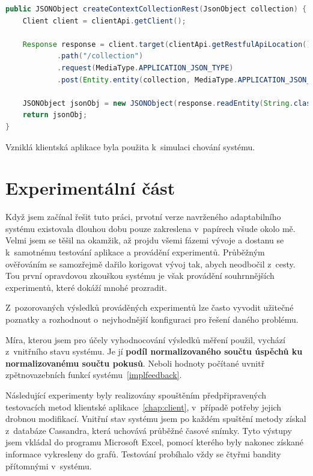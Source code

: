 \documentclass[thesis=M,czech]{FITthesis}[2014/05/07]
\begin{document}
\begin{lstlisting}[language=java]
public JSONObject createContextCollectionRest(JsonObject collection) {
    Client client = clientApi.getClient();

    Response response = client.target(clientApi.getRestfulApiLocation())
            .path("/collection")
            .request(MediaType.APPLICATION_JSON_TYPE)
            .post(Entity.entity(collection, MediaType.APPLICATION_JSON_TYPE));

    JSONObject jsonObj = new JSONObject(response.readEntity(String.class));
    return jsonObj;
}
\end{lstlisting}

Vzniklá klientská aplikace byla použita k~simulaci chování systému.

\chapter{Experimentální část}
\label{chap:tests}
Když jsem začínal řešit tuto práci, prvotní verze navrženého adaptabilního systému existovala dlouhou dobu pouze zakreslena v~papírech všude okolo mě. Velmi jsem se těšil na okamžik, až projdu všemi fázemi vývoje a dostanu se k~samotnému testování aplikace a provádění experimentů. Průběžným ověřováním se samozřejmě dařilo korigovat vývoj tak, abych neodbočil z~cesty. Tou první opravdovou zkouškou systému je však provádění souhrnnějších experimentů, které dokáží mnohé prozradit.

Z~pozorovaných výsledků prováděných experimentů lze často vyvodit užitečné poznatky a rozhodnout o~nejvhodnější konfiguraci pro řešení daného problému.

Míra, kterou jsem pro účely vyhodnocování výsledků měření použil, vychází z~vnitřního stavu systému. Je jí \textbf{podíl normalizovaného součtu úspěchů ku normalizovanému součtu pokusů}. Neboli hodnoty počítané uvnitř zpětnovazebních funkcí systému~\ref{implfeedback}. 

Následující experimenty byly realizovány spouštěním předpřipravených testovacích metod klientské aplikace~\ref{chap:client}, v~případě potřeby jejich drobnou modifikací. Vnitřní stav systému jsem po každém spuštění metody získal z~databáze Cassandra, která uchovává průběžné časové snímky. Tyto výstupy jsem vkládal do programu Microsoft Excel, pomocí kterého byly nakonec získané informace vykresleny do grafů. Testování probíhalo vždy se čtyřmi bandity přítomnými v~systému.
\end{document}
